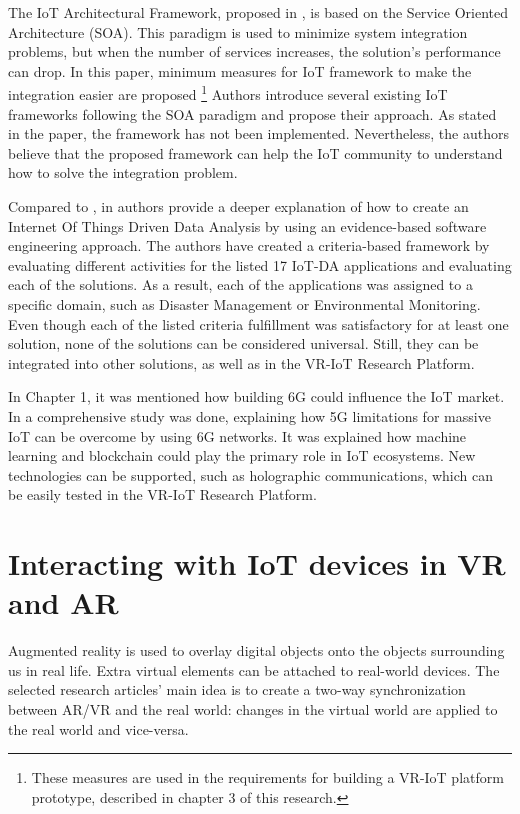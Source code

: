 The IoT Architectural Framework, proposed in \cite{uviase_iot_2018}, is based on the Service Oriented Architecture (SOA). This paradigm is used to minimize system integration problems, but when the number of services increases, the solution's performance can drop. In this paper, minimum measures for IoT framework to make the integration easier are proposed \footnote{These measures are used in the requirements for building a VR-IoT platform prototype, described in chapter 3 of this research.} Authors introduce several existing IoT frameworks following the SOA paradigm and propose their approach. As stated in the paper, the framework has not been implemented.  Nevertheless, the authors believe that the proposed framework can help the IoT community to understand how to solve the integration problem.

Compared to \cite{k_mohapatra_solution_2016}, in \cite{ahmad_software_2021} authors provide a deeper explanation of how to create an Internet Of Things Driven Data Analysis by using an evidence-based software engineering approach. The authors have created a criteria-based framework by evaluating different activities for the listed 17 IoT-DA applications and evaluating each of the solutions. As a result, each of the applications was assigned to a specific domain, such as Disaster Management or Environmental Monitoring. Even though each of the listed criteria fulfillment was satisfactory for at least one solution, none of the solutions can be considered universal. Still, they can be integrated into other solutions, as well as in the VR-IoT Research Platform.

In Chapter 1, it was mentioned how building 6G could influence the IoT market. In \cite{guo_enabling_2021} a comprehensive study was done, explaining how 5G limitations for massive IoT can be overcome by using 6G networks. It was explained how machine learning and blockchain could play the primary role in IoT ecosystems. New technologies can be supported, such as holographic communications, which can be easily tested in the VR-IoT Research Platform.

\section{Interacting with IoT devices in VR and AR}

Augmented reality is used to overlay digital objects onto the objects surrounding us in real life. Extra virtual elements can be attached to real-world devices. The selected research articles' main idea is to create a two-way synchronization between AR/VR and the real world: changes in the virtual world are applied to the real world and vice-versa.

